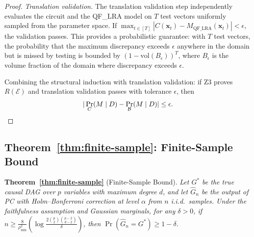 \documentclass[11pt]{article}
\DeclareMathOperator{\Pr}{Pr}
\begin{document}
\begin{proof}
\emph{Translation validation.}
The translation validation step independently evaluates the circuit and the QF\_LRA model on $T$ test vectors uniformly sampled from the parameter space.
If $\max_{t \in [T]} |C(\mathbf{x}_t) - M_{\text{QF\_LRA}}(\mathbf{x}_t)| < \epsilon$, the validation passes.
This provides a probabilistic guarantee: with $T$ test vectors, the probability that the maximum discrepancy exceeds $\epsilon$ anywhere in the domain but is missed by testing is bounded by $(1 - \text{vol}(B_\epsilon))^T$, where $B_\epsilon$ is the volume fraction of the domain where discrepancy exceeds $\epsilon$.

Combining the structural induction with translation validation:
if Z3 proves $R(\mathcal{E})$ and translation validation passes with tolerance $\epsilon$, then
\[
  |\Pr_C(M \mid D) - \Pr_{\mathcal{B}}(M \mid D)| \leq \epsilon. \qedhere
\]
\end{proof}

\subsection{Theorem~\ref{thm:finite-sample}: Finite-Sample Bound}

\noindent\textbf{Theorem~\ref{thm:finite-sample}} (Finite-Sample Bound).
\textit{Let $G^*$ be the true causal DAG over $p$ variables with maximum degree $d$, and let $\hat{G}_n$ be the output of PC with Holm--Bonferroni correction at level $\alpha$ from $n$ i.i.d.\ samples.
Under the faithfulness assumption and Gaussian marginals, for any $\delta > 0$, if
$n \geq \frac{8}{\rho_{\min}^2}\left(\log\frac{2\binom{p}{2}\binom{p-2}{d-2}}{\delta}\right)$,
then $\Pr(\hat{G}_n = G^*) \geq 1 - \delta$.}
\end{document}
